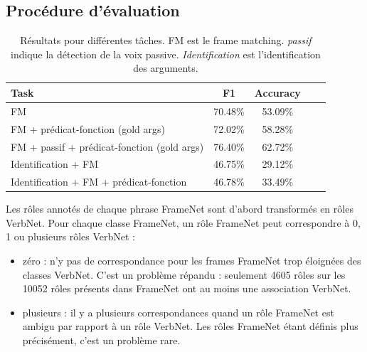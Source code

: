 
\subsection{Procédure d'évaluation}

\begin{table}[ht]
    \centering
    \begin{tabular}{lcccc}
        \toprule
        Task                                           & F1        & Accuracy \\
        \midrule
        FM                                             & 70.48\%   & 53.09\%  \\
        FM + prédicat-fonction (gold args)                & 72.02\%   & 58.28\%  \\
        FM + passif + prédicat-fonction (gold args)      & 76.40\%   & 62.72\%  \\
        \midrule
        Identification + FM                            & 46.75\%   & 29.12\%  \\
        Identification + FM + prédicat-fonction           & 46.78\%   & 33.49\%  \\
        \bottomrule
    \end{tabular}
    \caption{\protect\centering\label{table:results}Résultats pour différentes tâches. FM est le frame matching. \emph{passif} indique la détection de la voix passive. \emph{Identification} est l'identification des arguments.}
\end{table}

Les rôles annotés de chaque phrase FrameNet sont d'abord transformés en rôles
VerbNet. Pour chaque classe FrameNet, un rôle FrameNet peut correspondre à 0, 1
ou plusieurs rôles VerbNet :

\begin{itemize}

    \item zéro : n'y pas de correspondance pour les frames FrameNet trop éloignées
    des classes VerbNet. C'est un problème répandu :  seulement 4605 rôles sur les
    10052 rôles présents dans FrameNet ont au moins une association VerbNet.

    \item plusieurs : il y a plusieurs correspondances quand un rôle FrameNet
    est ambigu par rapport à un rôle VerbNet. Les rôles FrameNet étant définis plus
    précisément, c'est un problème rare. %

\end{itemize}

